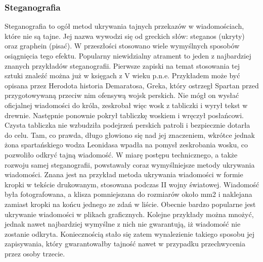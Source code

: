 \documentclass[10pt, a4paper, titlepage]{article}
\begin{document}
\subsubsection{Steganografia}
Steganografia to ogół metod ukrywania tajnych przekazów w wiadomościach, które nie są tajne. Jej nazwa wywodzi się od greckich słów: steganos (ukryty) oraz graphein (pisać). W przeszłości stosowano wiele wymyślnych sposobów osiągnięcia tego efektu. Popularny niewidzialny atrament to jeden z najbardziej znanych przykładów steganografii. Pierwsze zapiski na temat stosowania tej sztuki znaleźć można już w księgach z V wieku p.n.e. Przykładem może być opisana przez Herodota historia Demaratosa, Greka, który ostrzegł Spartan przed przygotowywaną przeciw nim ofensywą wojsk perskich. Nie mógł on wysłać oficjalnej wiadomości do króla, zeskrobał więc wosk z tabliczki i wyrył tekst w drewnie. Następnie ponownie pokrył tabliczkę woskiem i wręczył posłańcowi. Czysta tabliczka nie wzbudziła podejrzeń perskich patroli i bezpiecznie dotarła do celu. Tam, co prawda, długo głowiono się nad jej znaczeniem, wkrótce jednak żona spartańskiego wodza Leonidasa wpadła na pomysł zeskrobania wosku, co pozwoliło odkryć tajną wiadomość. W miarę postępu technicznego, a także rozwoju samej steganografii, powstawały coraz wymyślniejsze metody ukrywania wiadomości. Znana jest na przykład metoda ukrywania wiadomości w formie kropki w tekście drukowanym, stosowana podczas II wojny światowej. Wiadomość była fotografowana, a klisza pomniejszana do rozmiarów około mm2 i naklejana zamiast kropki na końcu jednego ze zdań w liście. Obecnie bardzo popularne jest ukrywanie wiadomości w plikach graficznych. Kolejne przykłady można mnożyć, jednak nawet najbardziej wymyślne z nich nie gwarantują, iż wiadomość nie zostanie odkryta. Koniecznością stało się zatem wynalezienie takiego sposobu jej zapisywania, który gwarantowałby tajność nawet w przypadku przechwycenia przez osoby trzecie.
\end{document}
